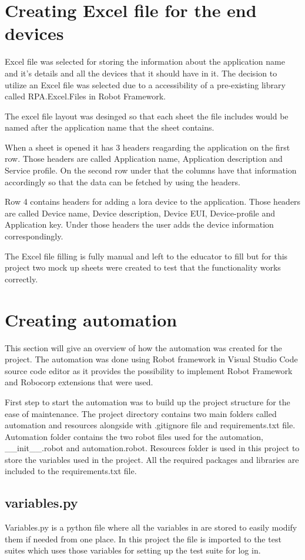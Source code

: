 \section{Creating Excel file for the end devices}
Excel file was selected for storing the information about the application name and it's details and all the devices that it should have in it.
The decision to utilize an Excel file was selected due to a accessibility of a pre-existing library called RPA.Excel.Files in Robot Framework.

The excel file layout was desinged so that each sheet the file includes would be named after the application name that the sheet contains.

When a sheet is opened it has 3 headers reagarding the application on the first row.
Those headers are called Application name, Application description and Service profile.
On the second row under that the columns have that information accordingly so that the data can be fetched by using the headers.

Row 4 contains headers for adding a \gls{lora} device to the application.
Those headers are called Device name, Device description, Device EUI, Device-profile and Application key.
Under those headers the user adds the device information correspondingly.

The Excel file filling is fully manual and left to the educator to fill but for this project two mock up sheets were created to test that the functionality works correctly.
\section{Creating automation}
This section will give an overview of how the automation was created for the project.
The automation was done using Robot framework in Visual Studio Code source code editor as it provides the possibility to implement Robot Framework and Robocorp extensions that were used.

First step to start the automation was to build up the project structure for the ease of maintenance.
The project directory contains two main folders called automation and resources alongside with .gitignore file and requirements.txt file.
Automation folder contains the two robot files used for the automation, \_\_init\_\_.robot and automation.robot.
Resources folder is used in this project to store the variables used in the project.
All the required packages and libraries are included to the requirements.txt file.
\subsection{variables.py}
Variables.py is a python file where all the variables in are stored to easily modify them if needed from one place.
In this project the file is imported to the test suites which uses those variables for setting up the test suite for log in.

